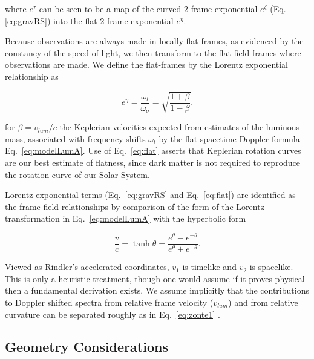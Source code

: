 \documentclass[reprint,%
 amsmath,amssymb,
 aps,
]{revtex4-1}
\begin{document}
where   $e^{\tau}$ can be seen to be  a  map  of the curved 2-frame exponential  $e^\zeta$ (Eq.~ \ref{eq:gravRS})  into  the flat 2-frame exponential $e^\eta$.  

 Because  observations are always made in locally flat frames, as evidenced by the  constancy of the speed of light, we then transform to  
 the  flat field-frames  where observations are made. We  define the flat-frames  by the
Lorentz exponential  relationship as

\begin{equation}
    e^{\eta}=\frac{\omega_{l}}{\omega_o}= \sqrt{\frac{1+\beta}{1-\beta}}.
    \label{eq:flat}
\end{equation}  
     

for   $\beta = v_{lum}/c$   the Keplerian velocities  expected   from estimates of the luminous mass, associated with    frequency shifts $\omega_{l}$ by the flat spacetime Doppler formula Eq.~\ref{eq:modelLumA}.   
Use of Eq.~\ref{eq:flat} asserts  that Keplerian rotation curves are  our     best estimate of flatness, since dark matter is not required to  reproduce the rotation curve of our Solar System.  


 Lorentz exponential terms (Eq.~\ref{eq:gravRS} and Eq.~\ref{eq:flat})
  are    identified  as the  frame field relationships   by  comparison of 
     the form of the  Lorentz transformation in  Eq.~\ref{eq:modelLumA} with 
the  hyperbolic form \cite{rindler2013essential} 


     \begin{equation}
         \frac{v}{c} = \tanh \theta = \frac{e^\theta - e^{-\theta}}{e^\theta + e^{-\theta}} .   
         \label{boost}
     \end{equation} 

 
 
  
  Viewed as    Rindler's accelerated coordinates\cite{MTW,Wald, rindler2013essential}, 
     $v_1$   is  timelike   and $v_2$ is spacelike.  This is only a heuristic treatment, though one would assume if it proves physical then a fundamental derivation exists.      
We       assume  implicitly   that the contributions to  Doppler shifted spectra from  relative frame  velocity ($v_{lum}$) and from relative curvature can be  separated   roughly as in Eq.~\ref{eq:zonte1} \cite{Jack,Cisn}.  
  
 
 

 
\subsection{  Geometry Considerations  }\label{GeomSphere}
  
\end{document}
